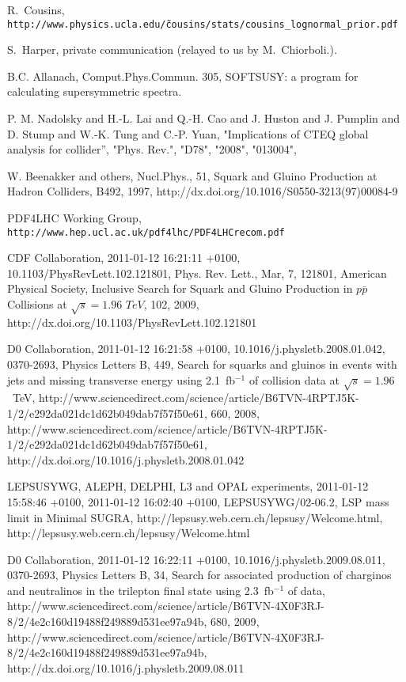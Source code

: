 \begin{thebibliography}{10}
 R.~Cousins, {\tt http://www.physics.ucla.edu/\~cousins/stats/cousins\_lognormal\_prior.pdf}

 S.~Harper, private communication (relayed to us by M.~Chiorboli.).

 B.C. Allanach, Comput.Phys.Commun. 305, SOFTSUSY: a program for calculating supersymmetric spectra.

      {P. M. Nadolsky and H.-L. Lai and Q.-H. Cao and J. Huston and J. Pumplin and D. Stump and W.-K. Tung and C.-P. Yuan},
      "Implications of CTEQ global analysis for collider'',
      "Phys. Rev.",
      "D78",
      "2008",
      "013004",

	{W. Beenakker and others},
	{Nucl.Phys.},
	{51},
	{Squark and Gluino Production at Hadron Colliders},
	{B492},
	{1997},
	{http://dx.doi.org/10.1016/S0550-3213(97)00084-9}

PDF4LHC Working Group, 
{\tt http://www.hep.ucl.ac.uk/pdf4lhc/PDF4LHCrecom.pdf}

        {{CDF Collaboration}},
	{2011-01-12 16:21:11 +0100},
	{10.1103/PhysRevLett.102.121801},
	{Phys. Rev. Lett.},
	{Mar},
	{7},
	{121801},
	{American Physical Society},
	{Inclusive Search for Squark and Gluino Production in {$p\bar{p}$} Collisions at $\sqrt{s}=1.96\,\,TeV$},
	{102},
	{2009},
	{http://dx.doi.org/10.1103/PhysRevLett.102.121801}

	{{D0 Collaboration}},
	{2011-01-12 16:21:58 +0100},
	{10.1016/j.physletb.2008.01.042},
	{0370-2693},
	{Physics Letters B},
	{449},
	{Search for squarks and gluinos in events with jets and missing transverse energy using 2.1~fb{${}^{-1}$} of collision data at {$\sqrt{s}=1.96$}~TeV},
	{http://www.sciencedirect.com/science/article/B6TVN-4RPTJ5K-1/2/e292da021dc1d62b049dab7f57f50e61},
	{660},
	{2008},
	{http://www.sciencedirect.com/science/article/B6TVN-4RPTJ5K-1/2/e292da021dc1d62b049dab7f57f50e61},
	{http://dx.doi.org/10.1016/j.physletb.2008.01.042}

	{{LEPSUSYWG, ALEPH, DELPHI, L3 and OPAL experiments}},
	{2011-01-12 15:58:46 +0100},
	{2011-01-12 16:02:40 +0100},
	{LEPSUSYWG/02-06.2},
	{LSP mass limit in Minimal SUGRA},
	{http://lepsusy.web.cern.ch/lepsusy/Welcome.html},
	{http://lepsusy.web.cern.ch/lepsusy/Welcome.html}

	{{D0 Collaboration}},
	{2011-01-12 16:22:11 +0100},
	{10.1016/j.physletb.2009.08.011},
	{0370-2693},
	{Physics Letters B},
	{34},
	{Search for associated production of charginos and neutralinos in the trilepton final state using 2.3~fb{${}^{-1}$} of data},
	{http://www.sciencedirect.com/science/article/B6TVN-4X0F3RJ-8/2/4e2c160d19488f249889d531ee97a94b},
	{680},
	{2009},
	{http://www.sciencedirect.com/science/article/B6TVN-4X0F3RJ-8/2/4e2c160d19488f249889d531ee97a94b},
	{http://dx.doi.org/10.1016/j.physletb.2009.08.011}





\end{thebibliography}
